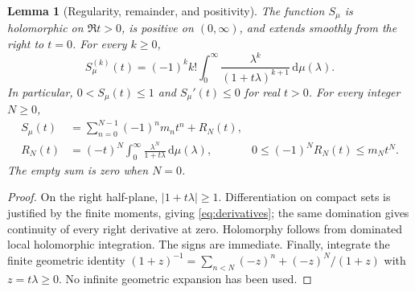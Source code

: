 \documentclass[11pt,a4paper]{article}
\numberwithin{equation}{section}
\newtheorem{lemma}[theorem]{Lemma}
\theoremstyle{definition}
\theoremstyle{remark}
\newcommand{\dd}{\,\mathrm d}
\begin{document}
\begin{lemma}[Regularity, remainder, and positivity]
\label{lem:regularity}
The function \(S_\mu\) is holomorphic on \(\Re t>0\), is positive on
\((0,\infty)\), and extends smoothly from the right to \(t=0\). For every
\(k\ge0\),
\begin{equation}
 S_\mu^{(k)}(t)=(-1)^kk!\int_0^\infty
 \frac{\lambda^k}{(1+t\lambda)^{k+1}}\dd\mu(\lambda).
 \label{eq:derivatives}
\end{equation}
In particular, \(0<S_\mu(t)\le1\) and \(S_\mu'(t)\le0\) for real \(t>0\).
For every integer \(N\ge0\),
\begin{align}
 S_\mu(t)&=\sum_{n=0}^{N-1}(-1)^n m_nt^n+R_N(t),\label{eq:remainder}\\
 R_N(t)&=(-t)^N\int_0^\infty
       \frac{\lambda^N}{1+t\lambda}\dd\mu(\lambda),
 &0\le(-1)^N R_N(t)\le m_Nt^N.\label{eq:remainder-bound}
\end{align}
The empty sum is zero when \(N=0\).
\end{lemma}
\begin{proof}
On the right half-plane, \(|1+t\lambda|\ge1\). Differentiation on compact
sets is justified by the finite moments, giving
\eqref{eq:derivatives}; the same domination gives continuity of every
right derivative at zero. Holomorphy follows from dominated local
holomorphic integration. The signs are immediate. Finally, integrate the
finite geometric identity
\((1+z)^{-1}=\sum_{n<N}(-z)^n+(-z)^N/(1+z)\)
with \(z=t\lambda\ge0\). No infinite geometric expansion has been used.
\end{proof}
\end{document}
